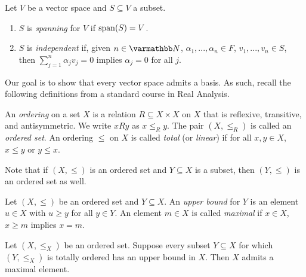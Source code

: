     \begin{definition}
        Let $V$ be a vector space and $S \subseteq V$ a subset.
            \begin{enumerate}[label = (\arabic*),itemsep=1pt,topsep=3pt]
                \item $S$ is \textit{spanning} for $V$ if $\operatorname{span}(S) = V$.
                \item $S$ is \textit{independent} if, given $n \in \bfN$, $\alpha_1,...,\alpha_n \in F$, $v_1,...,v_n \in S$, then $\sum_{j = 1}^n \alpha_j v_j = 0$ implies $\alpha_j = 0$ for all $j$.
            \end{enumerate}
    \end{definition}

    \begin{center}
    \end{center}

    Our goal is to show that every vector space admits a basis. As such, recall the following definitions from a standard course in Real Analysis.

    \begin{definition}
        An \textit{ordering} on a set $X$ is a relation $R \subseteq X \times X$ on $X$ that is reflexive, transitive, and antisymmetric. We write $xRy$ as $x \leq_R y$. The pair $(X,\leq_R)$ is called an \textit{ordered set}. An ordering $\leq$ on $X$ is called \textit{total} (or \textit{linear}) if for all $x,y \in X$, $x \leq y$ or $y \leq x$.
    \end{definition}

    Note that if $(X,\leq)$ is an ordered set and $Y \subseteq X$ is a subset, then $(Y,\leq)$ is an ordered set as well.

    \begin{definition}
        Let $(X, \leq)$ be an ordered set and $Y \subseteq X$. An \textit{upper bound} for $Y$ is an element $u \in X$ with $u \geq y$ for all $y \in Y$. An element $m \in X$ is called \textit{maximal} if $x \in X$, $x \geq m$ implies $x = m$.
    \end{definition}

    \begin{lemma}
        Let $(X,\leq_X)$ be an ordered set. Suppose every subset $Y \subseteq X$ for which $(Y,\leq_X)$ is totally ordered has an upper bound in $X$. Then $X$ admits a maximal element.
    \end{lemma}

